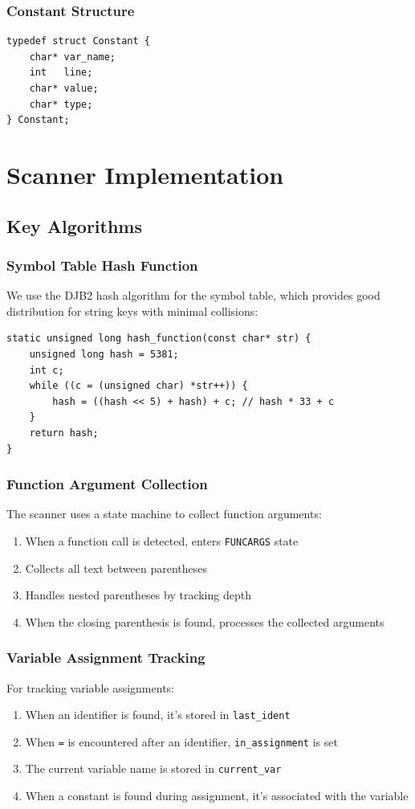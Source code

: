 \documentclass[12pt]{article}
\begin{document}
\subsubsection{Constant Structure}
\begin{verbatim}
typedef struct Constant {
    char* var_name; 
    int   line;
    char* value;
    char* type; 
} Constant;
\end{verbatim}

\section{Scanner Implementation}

\subsection{Key Algorithms}

\subsubsection{Symbol Table Hash Function}
We use the DJB2 hash algorithm for the symbol table, which provides good distribution for string keys with minimal collisions:

\begin{verbatim}
static unsigned long hash_function(const char* str) {
    unsigned long hash = 5381;
    int c;
    while ((c = (unsigned char) *str++)) {
        hash = ((hash << 5) + hash) + c; // hash * 33 + c
    }
    return hash;
}
\end{verbatim}

\subsubsection{Function Argument Collection}
The scanner uses a state machine to collect function arguments:
\begin{enumerate}
    \item When a function call is detected, enters \texttt{FUNCARGS} state
    \item Collects all text between parentheses
    \item Handles nested parentheses by tracking depth
    \item When the closing parenthesis is found, processes the collected arguments
\end{enumerate}

\subsubsection{Variable Assignment Tracking}
For tracking variable assignments:
\begin{enumerate}
    \item When an identifier is found, it's stored in \texttt{last\_ident}
    \item When \texttt{=} is encountered after an identifier, \texttt{in\_assignment} is set
    \item The current variable name is stored in \texttt{current\_var}
    \item When a constant is found during assignment, it's associated with the variable
\end{enumerate}
\end{document}
